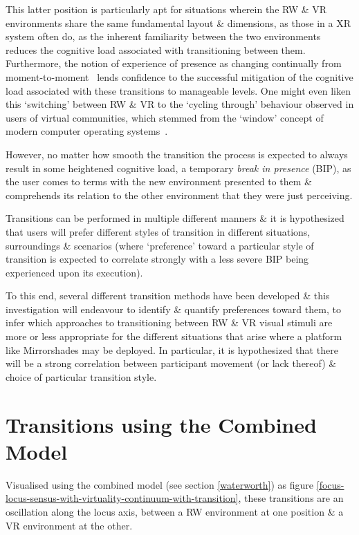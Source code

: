 \documentclass[oneside]{book}
\begin{document}
This latter position is particularly apt for situations wherein the RW \& VR environments share the same fundamental layout \& dimensions, as those in a XR system often do, as the inherent familiarity between the two environments reduces the cognitive load associated with transitioning between them. Furthermore, the notion of experience of presence as changing continually from moment-to-moment~\cite{Heeter2003, Ijsselsteijn1998} lends confidence to the successful mitigation of the cognitive load associated with these transitions to manageable levels. One might even liken this `switching' between RW \& VR to the `cycling through' behaviour observed in users of virtual communities, which stemmed from the `window' concept of modern computer operating systems~\cite{Turkle2004}.

However, no matter how smooth the transition the process is expected to always result in some heightened cognitive load, a temporary \textit{break in presence}\breakinpresencefootnote{} (BIP), as the user comes to terms with the new environment presented to them \& comprehends its relation to the other environment that they were just perceiving.

Transitions can be performed in multiple different manners \& it is hypothesized that users will prefer different styles of transition in different situations, surroundings \& scenarios (where `preference' toward a particular style of transition is expected to correlate strongly with a less severe BIP being experienced upon its execution).

To this end, several different transition methods have been developed \& this investigation will endeavour to identify \& quantify preferences toward them, to infer which approaches to transitioning between RW \& VR visual stimuli are more or less appropriate for the different situations that arise where a platform like Mirrorshades may be deployed. In particular, it is hypothesized that there will be a strong correlation between participant movement (or lack thereof) \& choice of particular transition style.

\section{Transitions using the Combined Model}
Visualised using the combined model (see section \ref{waterworth}) as figure \ref{focus-locus-sensus-with-virtuality-continuum-with-transition}, these transitions are an oscillation along the locus axis, between a RW environment at one position \& a VR environment at the other.
\end{document}
